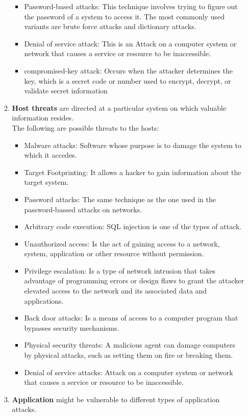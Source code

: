 \begin{enumerate}
\begin{enumerate}
\begin{itemize}
			\item Password-based attacks: This technique involves trying to figure out the password of a system to access it. The most commonly used variants are brute force attacks and dictionary attacks.
			\item Denial of service attack: This is an Attack on a computer system or network that causes a service or resource to be inaccessible.
			\item compromised-key attack: Occurs when the attacker determines the key, which is a secret code or number used to encrypt, decrypt, or validate secret information
		\end{itemize}
		\item \textbf{Host threats} are directed at a particular system on which valuable information resides.\\
		The following are possible threats to the hosts:
		\begin{itemize}
			\item Malware attacks: Software whose purpose is to damage the system to which it accedes.
			\item Target Footprinting: It allows a hacker to gain information about the target system.
			\item Password attacks: The same technique as the one used in the password-bassed attacks on networks. 
			\item Arbitrary code execution: SQL injection is one of the types of attack.
			\item Unauthorized access: Is the act of gaining access to a network, system, application or other resource without permission.
			\item Privilege escalation: Is a type of network intrusion that takes advantage of programming errors or design flaws to grant the attacker elevated access to the network and its associated data and applications. 
			\item Back door attacks: Is a means of access to a computer program that bypasses security mechanisms.
			\item Physical security threats: A malicious agent can damage computers by physical attacks, such as setting them on fire or breaking them.
			\item Denial of service attacks: Attack on a computer system or network that causes a service or resource to be inaccessible.
		\end{itemize}
	\newpage
		\item \textbf{Application} might be vulnerable to different types of application attacks.\\

\end{enumerate}
\end{enumerate}
